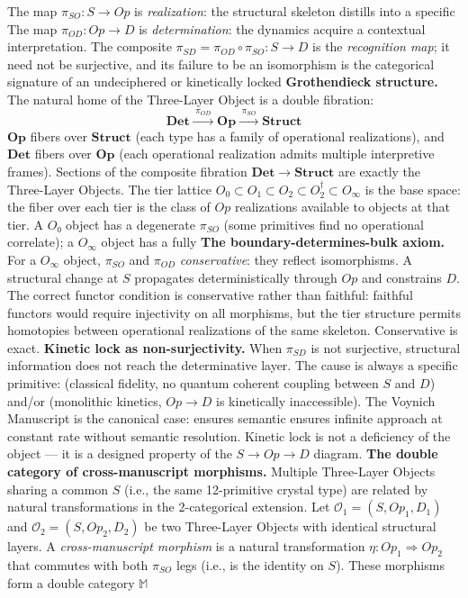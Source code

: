 \documentclass[12pt,a4paper]{article}
\makeatletter
\renewcommand{\_}{\ig@origunderscore\discretionary{}{}{}}
\makeatother
\begin{document}
The map $\pi_{SO}: S \to Op$ is \emph{realization}: the structural skeleton distills into a specific
The map $\pi_{OD}: Op \to D$ is \emph{determination}: the dynamics acquire a contextual interpretation. The composite
$\pi_{SD} = \pi_{OD} \circ \pi_{SO}: S \to D$ is the \emph{recognition map}; it need not be surjective, and its
failure to be an isomorphism is the categorical signature of an undeciphered or kinetically locked
\textbf{Grothendieck structure.} The natural home of the Three-Layer Object is a double fibration:
\[
 \mathbf{Det} \xrightarrow{\;\pi_{OD}\;} \mathbf{Op} \xrightarrow{\;\pi_{SO}\;} \mathbf{Struct}
\]
$\mathbf{Op}$ fibers over $\mathbf{Struct}$ (each type has a family of operational realizations), and
$\mathbf{Det}$ fibers over $\mathbf{Op}$ (each operational realization admits multiple interpretive frames). Sections
of the composite fibration $\mathbf{Det} \to \mathbf{Struct}$ are exactly the Three-Layer Objects. The tier lattice
$O_0 \subset O_1 \subset O_2 \subset O_2^\dagger \subset O_{\infty}$ is the base space: the fiber over each
tier is the class of $Op$ realizations available to objects at that tier. A $O₀$ object has a degenerate $\pi_{SO}$
(some primitives find no operational correlate); a $O_{\infty}$ object has a fully
\textbf{The boundary-determines-bulk axiom.} For a $O_{\infty}$ object, $\pi_{SO}$ and $\pi_{OD}$
\emph{conservative}: they reflect isomorphisms. A structural change at $S$ propagates deterministically through $Op$
and constrains $D$. The correct functor condition is conservative rather than faithful: faithful functors would require
injectivity on all morphisms, but the tier structure permits homotopies between operational realizations of the same
skeleton. Conservative is exact.
\textbf{Kinetic lock as non-surjectivity.} When $\pi_{SD}$ is not surjective, structural information does not reach the
determinative layer. The cause is always a specific primitive:  (classical fidelity, no quantum
coherent coupling between $S$ and $D$) and/or  (monolithic kinetics, $Op \to D$ is kinetically
inaccessible). The Voynich Manuscript is the canonical case:  ensures semantic
 ensures infinite approach at constant rate without semantic resolution. Kinetic lock is not a
deficiency of the object --- it is a designed property of the $S \to Op \to D$ diagram.
\textbf{The double category of cross-manuscript morphisms.} Multiple Three-Layer Objects sharing a common $S$ (i.e.,
the same 12-primitive crystal type) are related by natural transformations in the 2-categorical extension. Let
$\mathcal{O}_1 = (S, Op_1, D_1)$ and $\mathcal{O}_2 = (S, Op_2, D_2)$ be two Three-Layer Objects with identical
structural layers. A \emph{cross-manuscript morphism} is a natural transformation $\eta: Op_1 \Rightarrow Op_2$ that
commutes with both $\pi_{SO}$ legs (i.e., is the identity on $S$). These morphisms form a double category $\mathbb{M}$
\end{document}
